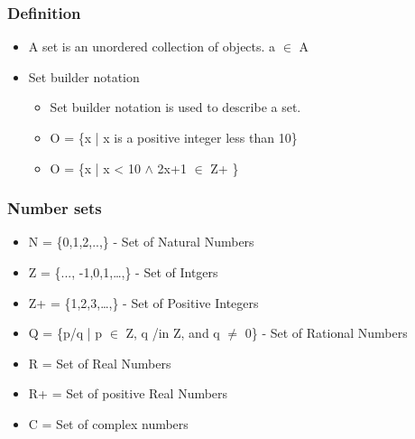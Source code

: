 \documentclass[11pt]{article}
\begin{document}
\subsubsection{Definition}
\label{sec-2-1-1}
\begin{itemize}

\item A set is an unordered collection of objects. a $\in$ A
\label{sec-2-1-1-1}%

\item Set builder notation
\label{sec-2-1-1-2}%
\begin{itemize}

\item Set builder notation is used to describe a set.
\label{sec-2-1-1-2-1}%

\item O = \{x | x is a positive integer less than 10\}
\label{sec-2-1-1-2-2}%

\item O = \{x | x < 10 $\wedge$ 2x+1 $\in$ Z+ \}
\label{sec-2-1-1-2-3}%
\end{itemize} %
\end{itemize} %
\subsubsection{Number sets}
\label{sec-2-1-2}
\begin{itemize}

\item N = \{0,1,2,..,\} - Set of Natural Numbers
\label{sec-2-1-2-1}%

\item Z = \{..., -1,0,1,\ldots{},\} - Set of Intgers
\label{sec-2-1-2-2}%

\item Z+ = \{1,2,3,\ldots{},\} - Set of Positive Integers
\label{sec-2-1-2-3}%

\item Q = \{p/q | p $\in$ Z, q /in Z, and q $\ne$ 0\} - Set of Rational Numbers
\label{sec-2-1-2-4}%

\item R = Set of Real Numbers
\label{sec-2-1-2-5}%

\item R+ = Set of positive Real Numbers
\label{sec-2-1-2-6}%

\item C = Set of complex numbers
\label{sec-2-1-2-7}%
\end{itemize} %
\end{document}
